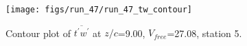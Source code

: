 \begin{figure}[H]
\centering
\texttt{[image: figs/run\_47/run\_47\_tw\_contour]}
\caption{Contour plot of $\overline{t^\prime w^\prime}$ at $z/c$=9.00, $V_{free}$=27.08, station 5.}
\end{figure}


